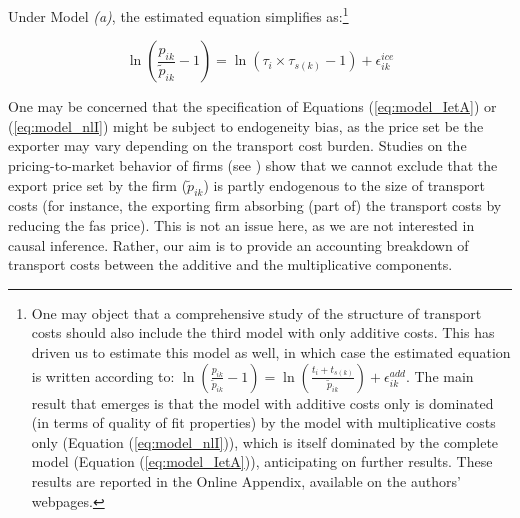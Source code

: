 \documentclass[a4paper,11pt]{article}
\begin{document}
Under Model  \textit{(a)}, the estimated equation simplifies as:\footnote{One may object that a comprehensive study of the structure of transport costs should also include the third model with only additive costs. This has driven us to estimate this model as well, in which case the estimated equation is written according to: $\ln\left(\frac{p_{ik}}{\widetilde{p}_{ik}}-1 \right)= \ln \left(\frac{t_{i} + t_{s(k)}}{\widetilde{p}_{ik}}\right) + \epsilon^{add}_{ik}$. The main result that emerges is that the model with additive costs only is dominated (in terms of quality of fit properties) by the model with multiplicative costs only (Equation (\ref{eq:model_nlI})), which is itself dominated by the complete model (Equation (\ref{eq:model_IetA})), anticipating on further results. These results are reported in the Online Appendix, available on the authors' webpages.}

\begin{equation}
\ln\left(\frac{p_{ik}}{\widetilde{p}_{ik}}-1 \right)= \ln \left(\tau_{i}\times\tau_{s(k)}-1 \right) + \epsilon^{ice}_{ik} \label{eq:model_nlI}
\end{equation}

One may be concerned that the specification of Equations (\ref{eq:model_IetA}) or (\ref{eq:model_nlI}) might be subject to endogeneity bias, as the price set be the exporter may vary depending on the transport cost burden. Studies on the pricing-to-market behavior of firms (see \citealp{Krugman-87}) show that we cannot exclude that the export price set by the firm ($\widetilde{p}_{ik}$) is partly endogenous to the size of transport costs (for instance, the exporting firm absorbing (part of) the transport costs by reducing the fas price). This is not an issue here, as we are not interested in causal inference. Rather, our aim is to provide an accounting breakdown of transport costs between the additive and the multiplicative components.

\end{document}
